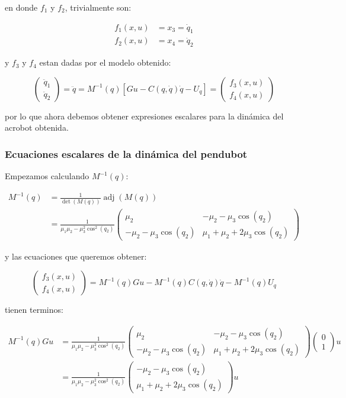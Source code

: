 \documentclass{article}
\DeclareMathOperator{\adjunta}{adj}
\begin{document}
en donde \(f_1\) y \(f_2\), trivialmente son:

\[
\begin{align}
f_1(x, u) &= x_3 = \dot{q}_1 \\
f_2(x, u) &= x_4 = \dot{q}_2
\end{align}
\]

y \(f_3\) y \(f_4\) estan dadas por el modelo obtenido:

\[
\begin{pmatrix}
\ddot{q}_1 \\
\ddot{q}_2
\end{pmatrix} = \ddot{q} = M^{-1}(q) \left[ G u - C(q, \dot{q}) \dot{q} - U_q \right] =
\begin{pmatrix}
f_3(x, u) \\
f_4(x, u)
\end{pmatrix}
\]

por lo que ahora debemos obtener expresiones escalares para la dinámica
del acrobot obtenida.

    \subsubsection*{Ecuaciones escalares de la dinámica del
pendubot}\label{ecuaciones-escalares-de-la-dinuxe1mica-del-pendubot}

Empezamos calculando \(M^{-1}(q)\):

\[
\begin{align}
M^{-1}(q) &= \frac{1}{\det{\left( M(q) \right)}} \adjunta{\left( M(q) \right)} \\
&= \frac{1}{\mu_1 \mu_2 - \mu_3^2 \cos^2{(q_2)}}
\begin{pmatrix}
\mu_2 & -\mu_2 - \mu_3 \cos{(q_2)} \\
-\mu_2 - \mu_3 \cos{(q_2)} & \mu_1 + \mu_2 + 2 \mu_3 \cos{(q_2)}
\end{pmatrix}
\end{align}
\]

y las ecuaciones que queremos obtener:

\[
\begin{pmatrix}
f_3(x, u) \\
f_4(x, u)
\end{pmatrix} = M^{-1}(q) G u - M^{-1}(q) C(q, \dot{q}) \dot{q} - M^{-1}(q) U_q
\]

tienen terminos:

\[
\begin{align}
M^{-1}(q) G u &= \frac{1}{\mu_1 \mu_2 - \mu_3^2 \cos^2{(q_2)}}
\begin{pmatrix}
\mu_2 & -\mu_2 - \mu_3 \cos{(q_2)} \\
-\mu_2 - \mu_3 \cos{(q_2)} & \mu_1 + \mu_2 + 2 \mu_3 \cos{(q_2)}
\end{pmatrix}
\begin{pmatrix}
0 \\
1
\end{pmatrix} u \\
&= \frac{1}{\mu_1 \mu_2 - \mu_3^2 \cos^2{(q_2)}}
\begin{pmatrix}
-\mu_2 - \mu_3 \cos{(q_2)} \\
\mu_1 + \mu_2 + 2 \mu_3 \cos{(q_2)}
\end{pmatrix} u
\end{align}
\]
\end{document}
